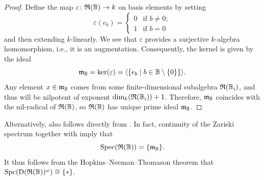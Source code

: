 \documentclass{amsart}
\begin{document}
    \begin{proof}
        Define the map $\varepsilon\colon \mathfrak{R}(\mathbb{B}) \to k$ on basis elements by setting
            \[
                \varepsilon(e_b) = 
                    \begin{cases}
                        0 & \text{if } b \neq 0; \\
                        1 & \text{if } b=0
                    \end{cases}
            \]
        and then extending $k$-linearly. We see that $\varepsilon$ provides a surjective $k$-algebra homomorphism, i.e., it is an augmentation. Consequently, the kernel is given by the ideal
            \begin{equation}\label{eq:maxideal}
                \mathfrak{m}_{\mathbb{B}} = \ker(\varepsilon) = \langle \{e_b \mid b \in \mathbb{B}\setminus\{0\}\}\rangle.
            \end{equation}
        Any element $x \in \mathfrak{m}_{\mathbb{B}}$ comes from some finite-dimensional subalgebra $\mathfrak{R}(\mathbb{B}_i)$, and thus will be nilpotent of exponent $\dim_{k}(\mathfrak{R}(\mathbb{B}_i))+1$. Therefore, $\mathfrak{m}_{\mathbb{B}}$ coincides with the nil-radical of $\mathfrak{R}(\mathbb{B})$, so $\mathfrak{R}(\mathbb{B})$ has unique prime ideal $\mathfrak{m}_{\mathbb{B}}$.
    \end{proof}
    
    \begin{Rem}\label{rem:localringalt}
        Alternatively,  also follows directly from . In fact, continuity of the Zariski spectrum together with  imply that 
            \[
                \operatorname{Spec}(\mathfrak{R}(\mathbb{B})) = \{\mathfrak{m}_{\mathbb{B}}\}.
            \]
        It thus follows from the Hopkins--Neeman--Thomason theorem \cite{Hopkins1987,Neeman1992Chromatic,Thomason1997} that $\operatorname{Spc}(\operatorname{D}(\mathfrak{R}(\mathbb{B}))^{\omega}) \cong \{\ast\}$. 
    \end{Rem}
    
\end{document}
